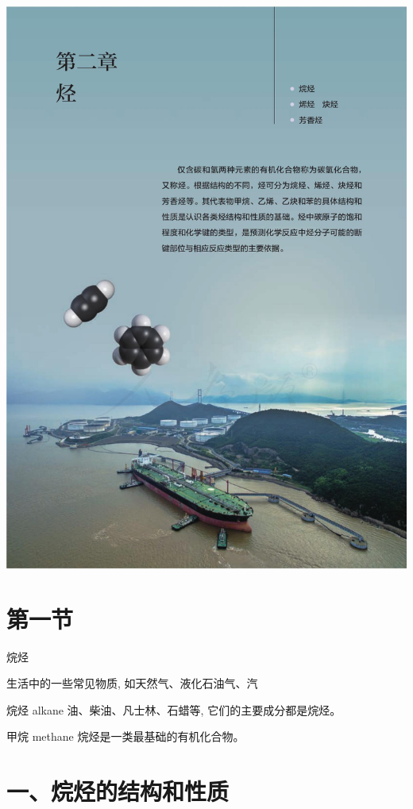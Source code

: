 \documentclass[10pt]{article}
\begin{document}
\begin{center}
\includegraphics[max width=1.0\textwidth]{images/0190efc5-b58a-7c43-bfb0-e0a030df9cfd_32_625959.jpg}
\end{center}

\section*{第一节}

烷烃

生活中的一些常见物质, 如天然气、液化石油气、汽

烷烃 alkane 油、柴油、凡士林、石蜡等, 它们的主要成分都是烷烃。

甲烷 methane 烷烃是一类最基础的有机化合物。

\section*{一、烷烃的结构和性质}
\end{document}
